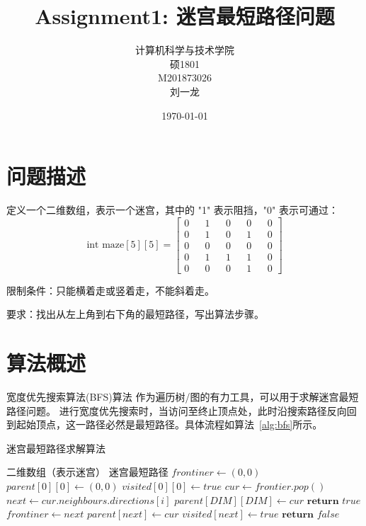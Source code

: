 \documentclass[UTF8,cs4size]{ctexart}
\title{\textbf{Assignment1: 迷宫最短路径问题}}
\author{计算机科学与技术学院\\ 硕1801\\ M201873026\\ 刘一龙}
\date{\today}
\begin{document}
\maketitle
\newpage
\tableofcontents
\newpage
{}

\section{问题描述}
定义一个二维数组，表示一个迷宫，其中的 "1" 表示阻挡，"0" 表示可通过：
\begin{equation*}
  \text{int maze}[5][5] =
  \begin{bmatrix}
    0 && 1 && 0 && 0 && 0 \\
    0 && 1 && 0 && 1 && 0 \\
    0 && 0 && 0 && 0 && 0 \\
    0 && 1 && 1 && 1 && 0 \\
    0 && 0 && 0 && 1 && 0
    \label{eq:maze1}
  \end{bmatrix}
\end{equation*}

限制条件：只能横着走或竖着走，不能斜着走。

要求：找出从左上角到右下角的最短路径，写出算法步骤。
\newpage

\section{算法概述}
宽度优先搜索算法(BFS)算法\cite{wiki:Breadth-first_search} 作为遍历树/图的有力工具，可以用于求解迷宫最短路径问题。
进行宽度优先搜索时，当访问至终止顶点处，此时沿搜索路径反向回到起始顶点，这一路径必然是最短路径。具体流程如算法~\ref{alg:bfs}所示。
\begin{algorithm}
	\renewcommand{\algorithmicrequire}{\textbf{输入:}}
	\renewcommand{\algorithmicensure}{\textbf{输出:}}
	\caption{迷宫最短路径求解算法}
	\label{alg:bfs}
	\begin{algorithmic}[1]
		\REQUIRE 二维数组（表示迷宫）
		\ENSURE 迷宫最短路径
		\STATE $frontiner \leftarrow (0, 0)$
    \STATE $parent[0][0] \leftarrow (0, 0)$
    \STATE $visited[0][0] \leftarrow true$
      \STATE $cur \leftarrow frontier.pop()$
        \STATE $next \leftarrow cur.neighbours.directions[i]$
          \STATE $parent[DIM][DIM] \leftarrow cur$ 
          \STATE $\textbf{return } true$
        \ENDIF
		      \STATE $frontiner \leftarrow next$
          \STATE $parent[next] \leftarrow cur$
		      \STATE $visited[next] \leftarrow true$
        \ENDIF
      \ENDFOR
    \ENDWHILE
    \STATE $\textbf{return } false$
	\end{algorithmic}  
\end{algorithm}
\newpage
\end{document}
